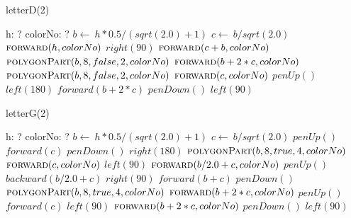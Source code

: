 \documentclass[a4paper,10pt]{article}
\begin{document}
\begin{algorithm}
\caption{letterD(2)}
\begin{algorithmic}[5]
\State {}
\State {}
    \State h: ?
    \State colorNo: ?
  \EndDecl
  \State \(b\gets\ h*0.5/(sqrt(2.0)+1)\)
  \State \(c\gets\ b/sqrt(2.0)\)
  \State \(\Call{forward}{h,colorNo}\)
  \State \(right(90)\)
  \State \(\Call{forward}{c+b,colorNo}\)
  \State {}
  \State {}
  \State \(\Call{polygonPart}{b,8,false,2,colorNo}\)
  \State \(\Call{forward}{b+2*c,colorNo}\)
  \State {}
  \State {}
  \State \(\Call{polygonPart}{b,8,false,2,colorNo}\)
  \State \(\Call{forward}{c,colorNo}\)
  \State \(penUp()\)
  \State \(left(180)\)
  \State \(forward(b+2*c)\)
  \State \(penDown()\)
  \State \(left(90)\)
\EndProcedure
\end{algorithmic}
\end{algorithm}


\begin{algorithm}
\caption{letterG(2)}
\begin{algorithmic}[5]
\State {}
\State {}
    \State h: ?
    \State colorNo: ?
  \EndDecl
  \State \(b\gets\ h*0.5/(sqrt(2.0)+1)\)
  \State \(c\gets\ b/sqrt(2.0)\)
  \State \(penUp()\)
  \State \(forward(c)\)
  \State \(penDown()\)
  \State \(right(180)\)
  \State {}
  \State {}
  \State \(\Call{polygonPart}{b,8,true,4,colorNo}\)
  \State \(\Call{forward}{c,colorNo}\)
  \State \(left(90)\)
  \State \(\Call{forward}{b/2.0+c,colorNo}\)
  \State \(penUp()\)
  \State \(backward(b/2.0+c)\)
  \State \(right(90)\)
  \State \(forward(b+c)\)
  \State \(penDown()\)
  \State {}
  \State {}
  \State \(\Call{polygonPart}{b,8,true,4,colorNo}\)
  \State \(\Call{forward}{b+2*c,colorNo}\)
  \State \(penUp()\)
  \State \(forward(c)\)
  \State \(left(90)\)
  \State \(\Call{forward}{b+2*c,colorNo}\)
  \State \(penDown()\)
  \State \(left(90)\)
\EndProcedure
\end{algorithmic}
\end{algorithm}
\end{document}
